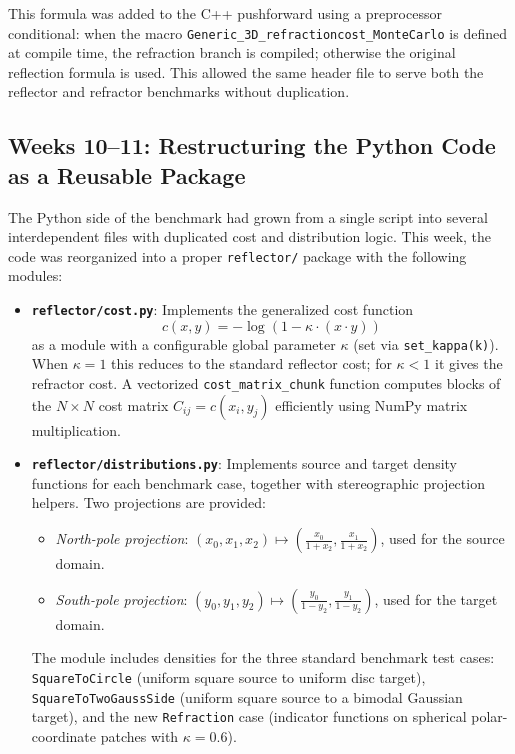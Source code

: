 \documentclass{article}
\begin{document}
This formula was added to the C++ pushforward using a preprocessor conditional: when the macro \texttt{Generic\_3D\_refractioncost\_MonteCarlo} is defined at compile time, the refraction branch is compiled; otherwise the original reflection formula is used. This allowed the same header file to serve both the reflector and refractor benchmarks without duplication.

\subsection{Weeks 10--11: Restructuring the Python Code as a Reusable Package}

The Python side of the benchmark had grown from a single script into several interdependent files with duplicated cost and distribution logic. This week, the code was reorganized into a proper \texttt{reflector/} package with the following modules:

\begin{itemize}
    \item \textbf{\texttt{reflector/cost.py}}: Implements the generalized cost function
    \begin{equation}
        c(x, y) = -\log(1 - \kappa \cdot (x \cdot y))
    \end{equation}
    as a module with a configurable global parameter $\kappa$ (set via \texttt{set\_kappa(k)}). When $\kappa = 1$ this reduces to the standard reflector cost; for $\kappa < 1$ it gives the refractor cost. A vectorized \texttt{cost\_matrix\_chunk} function computes blocks of the $N \times N$ cost matrix $C_{ij} = c(x_i, y_j)$ efficiently using NumPy matrix multiplication.

    \item \textbf{\texttt{reflector/distributions.py}}: Implements source and target density functions for each benchmark case, together with stereographic projection helpers. Two projections are provided:
    \begin{itemize}
        \item \emph{North-pole projection}: $(x_0, x_1, x_2) \mapsto \left(\tfrac{x_0}{1+x_2}, \tfrac{x_1}{1+x_2}\right)$, used for the source domain.
        \item \emph{South-pole projection}: $(y_0, y_1, y_2) \mapsto \left(\tfrac{y_0}{1-y_2}, \tfrac{y_1}{1-y_2}\right)$, used for the target domain.
    \end{itemize}
    The module includes densities for the three standard benchmark test cases: \texttt{SquareToCircle} (uniform square source to uniform disc target), \texttt{SquareToTwoGaussSide} (uniform square source to a bimodal Gaussian target), and the new \texttt{Refraction} case (indicator functions on spherical polar-coordinate patches with $\kappa = 0.6$).
\end{itemize}
\end{document}
